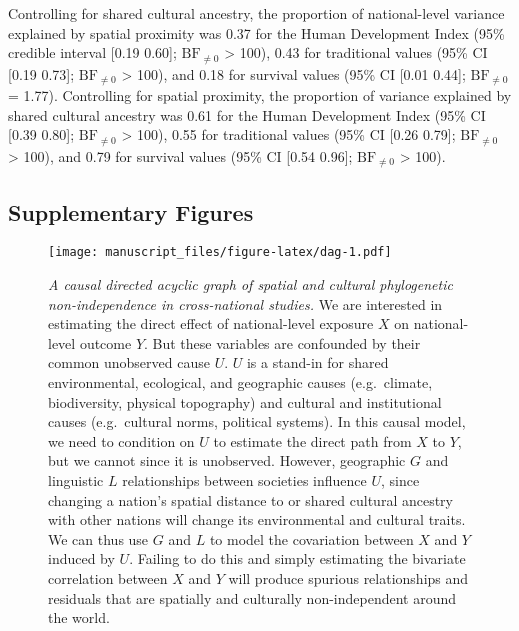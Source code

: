 \documentclass[english,man,floatsintext]{apa6}
\begin{document}
Controlling for shared cultural ancestry, the proportion of national-level variance explained by spatial proximity was 0.37 for the Human Development Index (95\% credible interval {[}0.19 0.60{]}; \(\text{BF}_{\neq0}\) \textgreater{} 100), 0.43 for traditional values (95\% CI {[}0.19 0.73{]}; \(\text{BF}_{\neq0}\) \textgreater{} 100), and 0.18 for survival values (95\% CI {[}0.01 0.44{]}; \(\text{BF}_{\neq0}\) = 1.77). Controlling for spatial proximity, the proportion of variance explained by shared cultural ancestry was 0.61 for the Human Development Index (95\% CI {[}0.39 0.80{]}; \(\text{BF}_{\neq0}\) \textgreater{} 100), 0.55 for traditional values (95\% CI {[}0.26 0.79{]}; \(\text{BF}_{\neq0}\) \textgreater{} 100), and 0.79 for survival values (95\% CI {[}0.54 0.96{]}; \(\text{BF}_{\neq0}\) \textgreater{} 100).

\newpage

\hypertarget{supplementary-figures}{%
\subsection{Supplementary Figures}\label{supplementary-figures}}



\begin{figure}
\centering
\texttt{[image: manuscript\_files/figure-latex/dag-1.pdf]}
\caption{\label{fig:dag}\emph{A causal directed acyclic graph of spatial and cultural phylogenetic non-independence in cross-national studies.} We are interested in estimating the direct effect of national-level exposure \(X\) on national-level outcome \(Y\). But these variables are confounded by their common unobserved cause \(U\). \(U\) is a stand-in for shared environmental, ecological, and geographic causes (e.g.~climate, biodiversity, physical topography) and cultural and institutional causes (e.g.~cultural norms, political systems). In this causal model, we need to condition on \(U\) to estimate the direct path from \(X\) to \(Y\), but we cannot since it is unobserved. However, geographic \(G\) and linguistic \(L\) relationships between societies influence \(U\), since changing a nation's spatial distance to or shared cultural ancestry with other nations will change its environmental and cultural traits. We can thus use \(G\) and \(L\) to model the covariation between \(X\) and \(Y\) induced by \(U\). Failing to do this and simply estimating the bivariate correlation between \(X\) and \(Y\) will produce spurious relationships and residuals that are spatially and culturally non-independent around the world.}
\end{figure}
\end{document}
